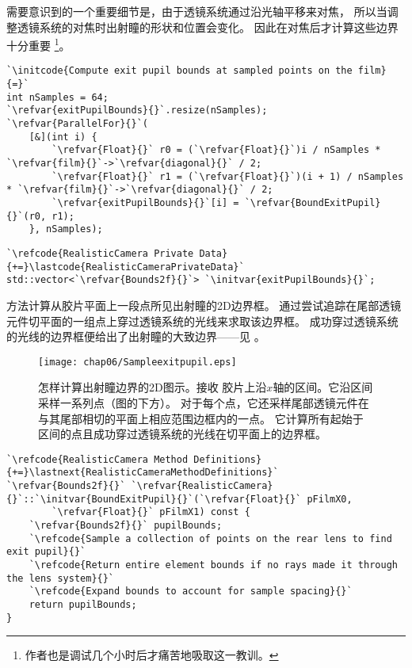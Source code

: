 需要意识到的一个重要细节是，由于透镜系统通过沿光轴平移来对焦，
所以当调整透镜系统的对焦时出射瞳的形状和位置会变化。
因此在对焦后才计算这些边界十分重要
\footnote{作者也是调试几个小时后才痛苦地吸取这一教训。}。
\begin{lstlisting}
`\initcode{Compute exit pupil bounds at sampled points on the film}{=}`
int nSamples = 64;
`\refvar{exitPupilBounds}{}`.resize(nSamples);
`\refvar{ParallelFor}{}`(
    [&](int i) {
        `\refvar{Float}{}` r0 = (`\refvar{Float}{}`)i / nSamples * `\refvar{film}{}`->`\refvar{diagonal}{}` / 2;
        `\refvar{Float}{}` r1 = (`\refvar{Float}{}`)(i + 1) / nSamples * `\refvar{film}{}`->`\refvar{diagonal}{}` / 2;
        `\refvar{exitPupilBounds}{}`[i] = `\refvar{BoundExitPupil}{}`(r0, r1);
    }, nSamples);
\end{lstlisting}
\begin{lstlisting}
`\refcode{RealisticCamera Private Data}{+=}\lastcode{RealisticCameraPrivateData}`
std::vector<`\refvar{Bounds2f}{}`> `\initvar{exitPupilBounds}{}`;
\end{lstlisting}

方法计算从胶片平面上一段点所见出射瞳的2D边界框。
通过尝试追踪在尾部透镜元件切平面的一组点上穿过透镜系统的光线来求取该边界框。
成功穿过透镜系统的光线的边界框便给出了出射瞳的大致边界——见
。
\begin{figure}[htbp]
    \centering\texttt{[image: chap06/Sampleexitpupil.eps]}
    \caption{怎样计算出射瞳边界的2D图示。接收
        胶片上沿$x$轴的区间。它沿区间采样一系列点（图的下方）。
        对于每个点，它还采样尾部透镜元件在与其尾部相切的平面上相应范围边框内的一点。
        它计算所有起始于区间的点且成功穿过透镜系统的光线在切平面上的边界框。}
    \label{fig:6.23}
\end{figure}
\begin{lstlisting}
`\refcode{RealisticCamera Method Definitions}{+=}\lastnext{RealisticCameraMethodDefinitions}`
`\refvar{Bounds2f}{}` `\refvar{RealisticCamera}{}`::`\initvar{BoundExitPupil}{}`(`\refvar{Float}{}` pFilmX0,
        `\refvar{Float}{}` pFilmX1) const {
    `\refvar{Bounds2f}{}` pupilBounds;
    `\refcode{Sample a collection of points on the rear lens to find exit pupil}{}`
    `\refcode{Return entire element bounds if no rays made it through the lens system}{}`
    `\refcode{Expand bounds to account for sample spacing}{}`
    return pupilBounds;
}
\end{lstlisting}

